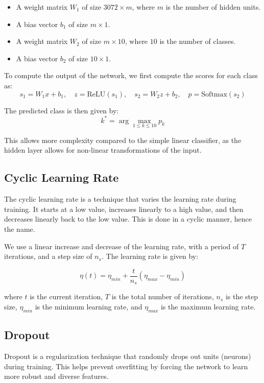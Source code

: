 \documentclass{article}
\begin{document}
\begin{itemize}
    \item A weight matrix $W_1$ of size $3072 \times m$, where $m$ is the number of hidden units.
    \item A bias vector $b_1$ of size $m \times 1$.
    \item A weight matrix $W_2$ of size $m \times 10$, where $10$ is the number of classes.
    \item A bias vector $b_2$ of size $10 \times 1$.
\end{itemize}

To compute the output of the network, we first compute the scores for each class as:
\[s_1 = W_1 x + b_1, \quad z = \text{ReLU}(s_1), \quad s_2 = W_2 z + b_2, \quad p = \text{Softmax}(s_2)\]

The predicted class is then given by:
\[
k^* = \arg\max_{1 \leq k \leq 10} p_k
\]

This allows more complexity compared to the simple linear classifier, as the hidden layer allows for non-linear transformations of the input.

\subsection{Cyclic Learning Rate}

The cyclic learning rate is a technique that varies the learning rate during training. It starts at a low value, increases linearly to a high value, and then decreases linearly back to the low value. This is done in a cyclic manner, hence the name.

We use a linear increase and decrease of the learning rate, with a period of $T$ iterations, and a step size of $n_s$. The learning rate is given by:

\begin{equation}
    \eta(t) = \eta_{min} + \frac{t}{n_s} (\eta_{max} - \eta_{min})
\end{equation}

where $t$ is the current iteration, $T$ is the total number of iterations, $n_s$ is the step size, $\eta_{min}$ is the minimum learning rate, and $\eta_{max}$ is the maximum learning rate.


\subsection{Dropout}

Dropout is a regularization technique that randomly drops out units (neurons) during training. This helps prevent overfitting by forcing the network to learn more robust and diverse features.
\end{document}
